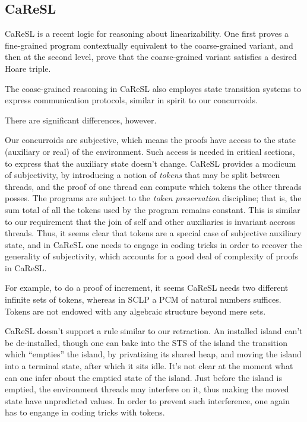 \subsection{CaReSL}

CaReSL is a recent logic for reasoning about linearizability. One
first proves a fine-grained program contextually equivalent to the
coarse-grained variant, and then at the second level, prove that the
coarse-grained variant satisfies a desired Hoare triple.

The coase-grained reasoning in CaReSL also employes state transition
systems to express communication protocols, similar in spirit to our
concurroids.

There are significant differences, however.

Our concurroids are subjective, which means the proofs have access to
the state (auxiliary or real) of the environment. Such access is
needed in critical sections, to express that the auxiliary state
doesn't change.  CaReSL provides a modicum of subjectivity, by
introducing a notion of \emph{tokens} that may be split between
threads, and the proof of one thread can compute which tokens the
other threads posses. The programs are subject to the \emph{token
  preservation} discipline; that is, the sum total of all the tokens
used by the program remains constant. This is similar to our
requirement that the join of self and other auxiliaries is invariant
accross threads. Thus, it seems clear that tokens are a special case
of subjective auxiliary state, and in CaReSL one needs to engage in
coding tricks in order to recover the generality of subjectivity,
which accounts for a good deal of complexity of proofs in CaReSL.

For example, to do a proof of increment, it seems CaReSL needs two
different infinite sets of tokens, whereas in SCLP a PCM of natural
numbers suffices. Tokens are not endowed with any algebraic structure
beyond mere sets.

CaReSL doesn't support a rule similar to our retraction. An installed
island can't be de-installed, though one can bake into the STS of the
island the transition which ``empties'' the island, by privatizing its
shared heap, and moving the island into a terminal state, after which
it sits idle. It's not clear at the moment what can one infer about
the emptied state of the island. Just before the island is emptied,
the environment threads may interfere on it, thus making the moved
state have unpredicted values. In order to prevent such interference,
one again has to engange in coding tricks with tokens.

